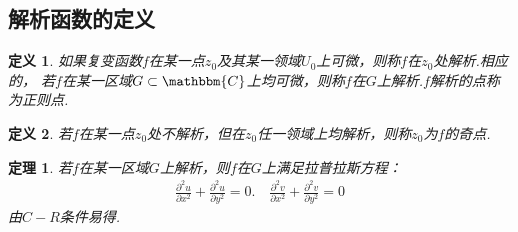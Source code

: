 \documentclass[12pt, a4paper]{ctexbook}
\newtheorem{definition}{定义}[chapter] %
\newtheorem{theorem}{定理}[chapter] %
\begin{document}
            \subsection{解析函数的定义}
                \begin{definition}
                    \label{def:analytic_function}
                    如果复变函数$f$在某一点$z_0$及其某一领域$U_0$上可微，则称$f$在$z_0$处解析.相应的，
                    若$f$在某一区域$G \subset \mathbbm{C}$上均可微，则称$f$在$G$上解析.$f$解析的点称为正则点.
                \end{definition}
                \begin{definition}
                    \label{def:singular_point}
                    若$f$在某一点$z_0$处不解析，但在$z_0$任一领域上均解析，则称$z_0$为$f$的奇点.
                \end{definition}
                \begin{theorem}
                    \label{the:Laplace_equation}
                    若$f$在某一区域$G$上解析，则$f$在$G$上满足拉普拉斯方程：
                    \begin{align*}
                        \frac{\partial^2 u}{\partial x^2} + \frac{\partial^2 u}{\partial y^2} = 0. \quad \frac{\partial^2 v}{\partial x^2} + \frac{\partial^2 v}{\partial y^2} = 0
                    \end{align*}
                    由$C-R$条件易得.
                \end{theorem}
\end{document}
